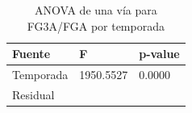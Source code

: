 \begin{table}[H]
\centering
\caption{ANOVA de una vía para FG3A/FGA por temporada}
\label{tab:anova-fg3}
\begin{tabular}{lll}
\toprule
Fuente & F & p-value \\
\midrule
Temporada & 1950.5527 & 0.0000 \\
Residual &  &  \\
\bottomrule
\end{tabular}
\end{table}
